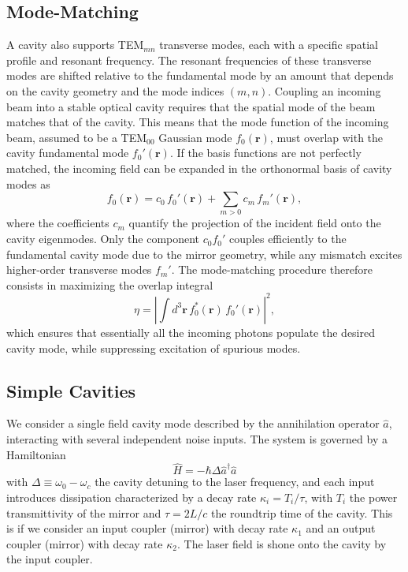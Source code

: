 \subsection{Mode-Matching}
A cavity also supports TEM$_{mn}$ transverse modes, each with a specific spatial profile and resonant frequency. The resonant frequencies of these transverse modes are shifted relative to the fundamental mode by an amount that depends on the cavity geometry and the mode indices $(m,n)$. Coupling an incoming beam into a stable optical cavity requires that the spatial mode of the beam matches that of the cavity. This means that the mode function of the incoming beam, assumed to be a TEM$_{00}$ Gaussian mode
 $f_{0}(\mathbf{r})$, must overlap with the cavity fundamental mode $f_{0}'(\mathbf{r})$. If the basis functions are not perfectly matched, the incoming field can be expanded in the orthonormal basis of cavity modes as
\begin{equation}
    f_{0}(\mathbf{r}) = c_{0}\, f_{0}'(\mathbf{r}) + \sum_{m>0} c_{m}\, f_{m}'(\mathbf{r}),
\end{equation}
where the coefficients $c_{m}$ quantify the projection of the incident field onto the cavity eigenmodes. Only the component $c_{0} f_{0}'$ couples efficiently to the fundamental cavity mode due to the mirror geometry, while any mismatch excites higher-order transverse modes $f_{m}'$. The mode-matching procedure therefore consists in maximizing the overlap integral
\begin{equation}
    \eta = \left| \int d^{3}\mathbf{r}\, f_{0}^{*}(\mathbf{r})\, f_{0}'(\mathbf{r}) \right|^{2},
\end{equation}
which ensures that essentially all the incoming photons populate the desired cavity mode, while suppressing excitation of spurious modes.

\subsection{\textrm{Simple} Cavities} \label{sec:simple_cavities}

We consider a single field cavity mode described by the annihilation operator \(\hat{a}\), interacting with several independent noise inputs. The system is governed by a Hamiltonian 
\begin{equation}
\hat{H} = - \hbar \Delta  \hat{a}^\dagger \hat{a} 
\end{equation}
 with  $\Delta\equiv\omega_0 - \omega_c$ the cavity detuning to the laser frequency, and each input introduces dissipation characterized by a decay rate \(\kappa_i = T_i/\tau\), with $T_i$ the power transmittivity of the mirror and $\tau=2L/c$ the roundtrip time of the cavity. This is if we consider an input coupler (mirror) with decay rate $\kappa_1$ and an output coupler (mirror) with decay rate $\kappa_2$. The laser field is shone onto the cavity by the input coupler. \\ 
 
